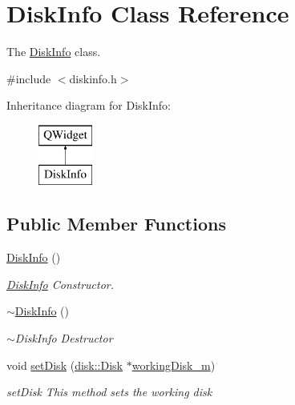 \hypertarget{class_disk_info}{}\section{Disk\+Info Class Reference}
\label{class_disk_info}


The \mbox{\hyperlink{class_disk_info}{Disk\+Info}} class.  




{\ttfamily \#include $<$diskinfo.\+h$>$}

Inheritance diagram for Disk\+Info\+:\begin{figure}[H]
\begin{center}
\leavevmode
\includegraphics[height=2.000000cm]{class_disk_info}
\end{center}
\end{figure}
\subsection*{Public Member Functions}
\begin{DoxyCompactItemize}
\item 
\mbox{\hyperlink{class_disk_info_aca4cde2e854e44f42f3edb8c9bba47ea}{Disk\+Info}} ()
\begin{DoxyCompactList}\small\item\em \mbox{\hyperlink{class_disk_info}{Disk\+Info}} Constructor. \end{DoxyCompactList}\item 
\mbox{\hyperlink{class_disk_info_a8a4c3385e2661ba6dc614d00f8dec9d9}{$\sim$\+Disk\+Info}} ()
\begin{DoxyCompactList}\small\item\em $\sim$\+Disk\+Info Destructor \end{DoxyCompactList}\item 
void \mbox{\hyperlink{class_disk_info_ad139f5d545b7dc2f8b69cc51a126bfda}{set\+Disk}} (\mbox{\hyperlink{classdisk_1_1_disk}{disk\+::\+Disk}} $\ast$\mbox{\hyperlink{class_disk_info_a955c186e1e1949712bf4e8e8c504b340}{working\+Disk\+\_\+m}})
\begin{DoxyCompactList}\small\item\em set\+Disk This method sets the working disk \end{DoxyCompactList}\end{DoxyCompactItemize}
